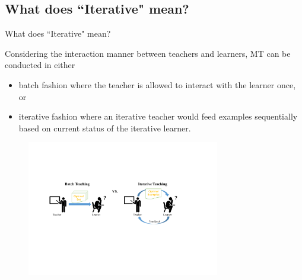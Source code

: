 \documentclass[aspectratio=169,xcolor=dvipsnames]{beamer}
\begin{document}
\subsection{What does ``Iterative" mean?}
\begin{frame}{What does ``Iterative" mean?}
\vspace{-2mm}

\justify
Considering the \alert{interaction manner} between teachers and learners, MT can be conducted in either\begin{itemize}
    \item {\color{blue} batch} fashion \cite{zhu2015machine, mansouri2019preference, kumar2021teaching, qian2022teaching} where the teacher is allowed to interact with the learner {\color{red} once}, or 
    \item {\color{blue} iterative} fashion \cite{liu2017iterative, liu2018towards, Liu2021LAST} where an iterative teacher would feed examples {\color{red} sequentially} based on current status of the iterative learner.
\end{itemize}

\begin{figure}
  \centering
  \includegraphics[width=0.75\textwidth]{Source/BatchVSiterative.pdf}
\end{figure}
\end{frame}
\end{document}
